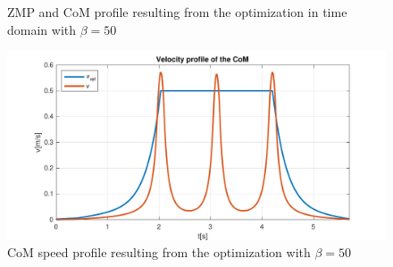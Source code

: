 \documentclass[a4paper]{article}
\begin{document}
\begin{figure}
\begin{minipage}[b]{0.48\textwidth}
        \caption{ZMP and CoM  profile resulting from the optimization in time domain with $\beta=50$} 
        \label{fig:opt_x_50_NO_SQD}
     \end{minipage}  
     \hfill
     \begin{minipage}[b]{0.48\textwidth}
         \centering
        \includegraphics[scale=0.4]{plot/OPT_TEMPO/50/v_opt_x_50_time_noSQD.pdf} 
        \caption{CoM speed profile resulting from the optimization with $\beta=50$} 
        \label{fig:opt_vx_50_NO_SQD}
     \end{minipage}   

\end{figure}
\end{document}
